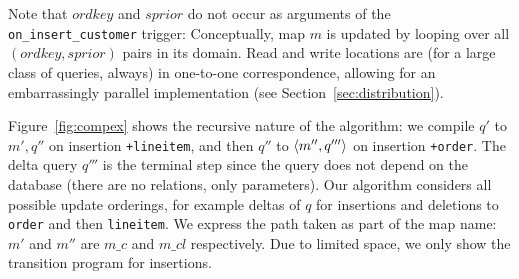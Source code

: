 \noindent
Note that $ordkey$ and $sprior$ do not occur as arguments of the {\tt
on\_insert\_customer} trigger: Conceptually, map $m$ is updated by looping over
all $(ordkey, sprior)$ pairs in its domain. Read and write locations are (for a
large class of queries, always) in one-to-one correspondence, allowing for an
embarrassingly parallel implementation (see Section~\ref{sec:distribution}).

Figure~\ref{fig:compex} shows the recursive nature of the algorithm: we compile
$q'$ to $m',q''$ on insertion {\tt +lineitem}, and then $q''$ to
${\langle m'',q'''\rangle}$ on insertion {\tt +order}. The delta query $q'''$ is the
terminal step since the query does not depend on the database (there are no
relations, only parameters). Our algorithm considers all possible update
orderings, for example deltas of $q$ for insertions and deletions to {\tt order}
and then {\tt lineitem}.  We express the path taken as part of the map name:
$m'$ and $m''$ are $m\_c$ and $m\_cl$ respectively.  Due to limited space, we
only show the transition program for insertions.


